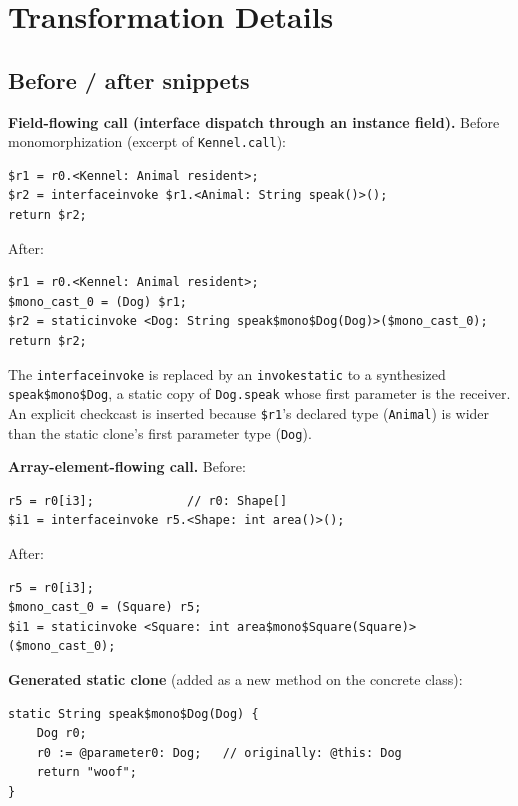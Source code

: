 \documentclass[11pt,a4paper]{article}
\begin{document}
\section{Transformation Details}

\subsection*{Before / after snippets}

\textbf{Field-flowing call (interface dispatch through an instance field).}
Before monomorphization (excerpt of \texttt{Kennel.call}):

\begin{lstlisting}[language=Jimple]
$r1 = r0.<Kennel: Animal resident>;
$r2 = interfaceinvoke $r1.<Animal: String speak()>();
return $r2;
\end{lstlisting}

After:

\begin{lstlisting}[language=Jimple]
$r1 = r0.<Kennel: Animal resident>;
$mono_cast_0 = (Dog) $r1;
$r2 = staticinvoke <Dog: String speak$mono$Dog(Dog)>($mono_cast_0);
return $r2;
\end{lstlisting}

The \texttt{interfaceinvoke} is replaced by an \texttt{invokestatic} to a
synthesized \texttt{speak\$mono\$Dog}, a static copy of \texttt{Dog.speak}
whose first parameter is the receiver. An explicit checkcast is inserted
because \texttt{\$r1}'s declared type (\texttt{Animal}) is wider than the
static clone's first parameter type (\texttt{Dog}).

\textbf{Array-element-flowing call.} Before:

\begin{lstlisting}[language=Jimple]
r5 = r0[i3];             // r0: Shape[]
$i1 = interfaceinvoke r5.<Shape: int area()>();
\end{lstlisting}

After:

\begin{lstlisting}[language=Jimple]
r5 = r0[i3];
$mono_cast_0 = (Square) r5;
$i1 = staticinvoke <Square: int area$mono$Square(Square)>($mono_cast_0);
\end{lstlisting}

\textbf{Generated static clone} (added as a new method on the concrete
class):

\begin{lstlisting}[language=Jimple]
static String speak$mono$Dog(Dog) {
    Dog r0;
    r0 := @parameter0: Dog;   // originally: @this: Dog
    return "woof";
}
\end{lstlisting}
\end{document}
